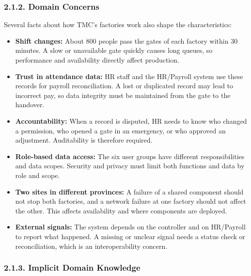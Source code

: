 \subsubsection*{2.1.2. Domain Concerns}

{}


Several facts about how TMC's factories work also shape the characteristics:

\begin{itemize}[leftmargin=36pt, itemsep=2pt, topsep=4pt, parsep=2pt]

  \item \textbf{Shift changes:} About 800 people pass the gates of each factory within 30 minutes. A slow or unavailable gate quickly causes long queues, so performance and availability directly affect production.

  \item \textbf{Trust in attendance data:} HR staff and the HR/Payroll system use these records for payroll reconciliation. A lost or duplicated record may lead to incorrect pay, so data integrity must be maintained from the gate to the handover.

  \item \textbf{Accountability:} When a record is disputed, HR needs to know who changed a permission, who opened a gate in an emergency, or who approved an adjustment. Auditability is therefore required.

  \item \textbf{Role-based data access:} The six user groups have different responsibilities and data scopes. Security and privacy must limit both functions and data by role and scope.

  \item \textbf{Two sites in different provinces:} A failure of a shared component should not stop both factories, and a network failure at one factory should not affect the other. This affects availability and where components are deployed.

  \item \textbf{External signals:} The system depends on the controller and on HR/Payroll to report what happened. A missing or unclear signal needs a status check or reconciliation, which is an interoperability concern.

\end{itemize}

\subsubsection*{2.1.3. Implicit Domain Knowledge}

